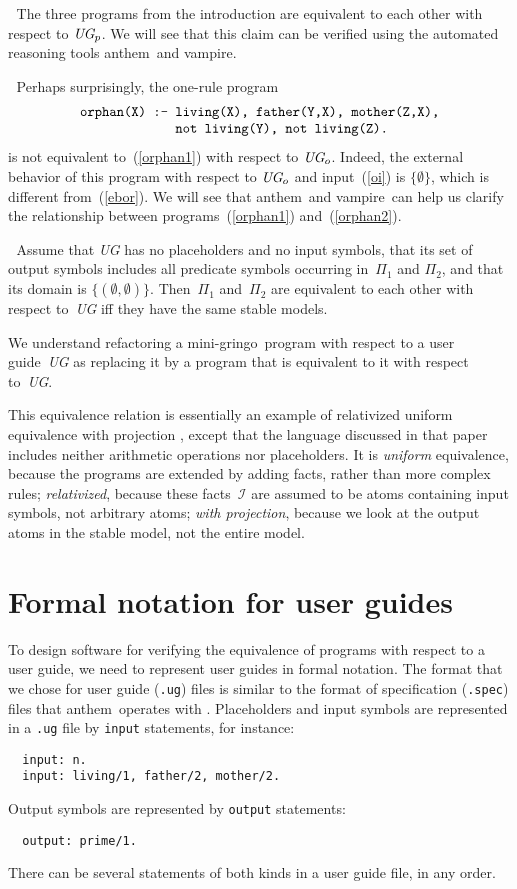 \documentclass{article}
\def\beq{\begin{equation}}
\def\eeq#1{\label{#1}\end{equation}}
\def\ba{\begin{array}}
\def\ea{\end{array}}
\def\gringo{{\sc gringo}}
\def\anthem{{\sc anthem}}
\def\vampire{{\sc vampire}}
\newcommand{\I}{\mathcal{I}}
\begin{document}
{\medskip{}$\;$ The three programs from the
introduction are equivalent to each other with respect to $\emph{UG}_p$.
We will see that this claim can be verified using the automated reasoning
tools \anthem\ and \vampire.

\medskip{}$\;$ Perhaps surprisingly,
the one-rule program
\beq\ba l
\verb|orphan(X) :- living(X), father(Y,X), mother(Z,X),|\\
\verb|             not living(Y), not living(Z).|
\ea\eeq{orphan2}
is not equivalent to~(\ref{orphan1}) with respect to $\emph{UG}_o$.
Indeed, the external behavior of this program with respect
to $\emph{UG}_o$ and input~(\ref{oi}) is $\{\emptyset\}$, which
is different from~(\ref{ebor}).  We will see
that \anthem\ and \vampire\ can help us clarify the relationship between
programs~(\ref{orphan1}) and~(\ref{orphan2}).

\medskip{}$\;$
Assume that \emph{UG} has no placeholders and no input symbols,
that its set of output symbols includes all predicate symbols occurring
in~$\Pi_1$ and $\Pi_2$, and that its domain is $\{(\emptyset,\emptyset)\}$.
Then~$\Pi_1$ and~$\Pi_2$ are equivalent to each other with
respect to~\emph{UG} iff they have the same stable models.

\medskip
We understand refactoring a mini-\gringo\ program with respect to a
  user guide~\emph{UG} as replacing it by a program that is equivalent
  to it with respect to~\emph{UG}.

This equivalence relation is essentially an
example of relativized uniform equivalence with projection
\cite{oet08}, except that the language discussed in that paper includes
neither arithmetic operations nor placeholders.
It is \emph{uniform} equivalence, because the programs are extended by
adding facts, rather than more complex rules; \emph{relativized},
because these
  facts~$\I$ are assumed to be atoms containing input symbols,
  not arbitrary atoms; \emph{with projection}, because
  we look at the output atoms in the stable model, not the entire model.

\section{Formal notation for user guides}

To design software for verifying the equivalence of
programs with respect to a user guide, we need to
represent user guides in formal notation.   The format that we chose for
user guide (\verb|.ug|) files is similar to the format of
specification (\verb|.spec|)
files that \anthem\ operates with \cite[Section~7]{fan20}.  Placeholders
and input symbols are represented in a \verb|.ug| file by
\verb|input| statements, for instance:
\begin{verbatim}
  input: n.
  input: living/1, father/2, mother/2.
\end{verbatim}
Output symbols are represented by \verb|output| statements:
\begin{verbatim}
  output: prime/1.
\end{verbatim}
There can be several statements of both kinds in a user guide file, in any
order.

}
\end{document}
